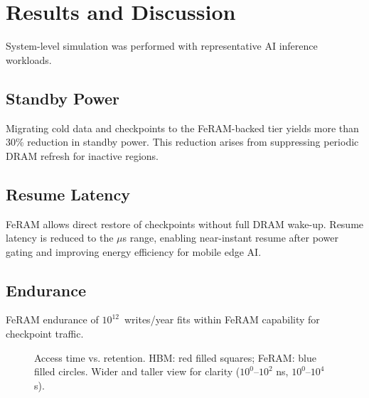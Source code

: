 \section{Results and Discussion}
System-level simulation was performed with representative AI inference workloads.

\subsection{Standby Power}
Migrating cold data and checkpoints to the FeRAM-backed tier yields more than 30\% reduction in standby power.
This reduction arises from suppressing periodic DRAM refresh for inactive regions.

\subsection{Resume Latency}
FeRAM allows direct restore of checkpoints without full DRAM wake-up.
Resume latency is reduced to the $\mu$s range, enabling near-instant resume after power gating and improving energy efficiency for mobile edge AI.

\subsection{Endurance}
FeRAM endurance of $10^{12}$~writes/year fits within FeRAM capability for checkpoint traffic.

\begin{figure}[!t]
\centering
{}
\caption{Access time vs. retention. HBM: red filled squares; FeRAM: blue filled circles. Wider and taller view for clarity ($10^0$–$10^2$ ns, $10^0$–$10^4$ s).}
\label{fig:retention}
\end{figure}
